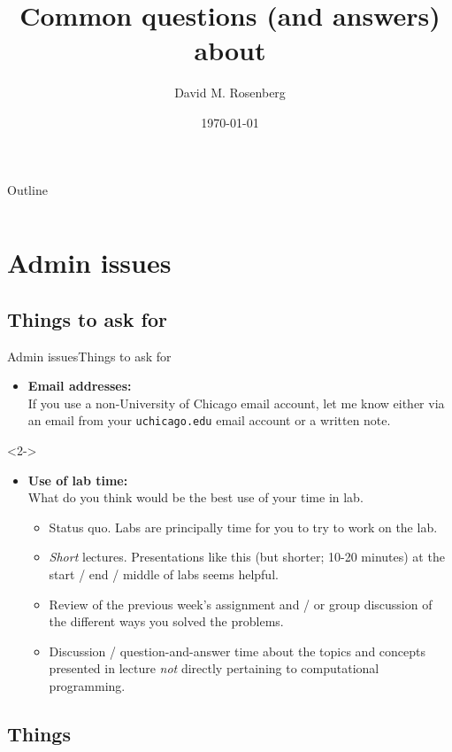 \documentclass[9pt]{beamer}
\title{Common questions (and answers) about \R  }
\author{David M. Rosenberg}
\institute[University of Chicago] %
{
  Committee on Neurobiology\\
  University of Chicago
}
\date{\today}
\begin{document}
\begin{frame}
  \titlepage
\end{frame}

\begin{frame}{Outline}
  \begin{columns}[c]
      \tableofcontents
    \end{columns}
\end{frame}




\section{Admin issues}
\subsection{Things to ask for}

\begin{frame}{Admin issues}{Things to ask for}
\begin{itemize}[<+->]
  \item \textbf{Email addresses:}\\
    If you use a non-University of Chicago email account, let me know either via an email from your {\tt uchicago.edu} email account or a written note.
  \end{itemize}
  \begin{onlyenv}<2->\begin{itemize}[<+->]
    \item \textbf{Use of lab time:}\\
      What do you think would be the best use of your time in lab.
      \begin{itemize}[<+->]
        \item Status quo.  Labs are principally time for you to try to work on the lab.
        \item \emph{Short} lectures. Presentations like this (but shorter; 10-20 minutes) at the start / end / middle of labs seems helpful.
        \item Review of the previous week's assignment and / or group discussion of the different ways you solved the problems.
        \item Discussion / question-and-answer time about the topics and concepts presented in lecture \emph{not} directly pertaining to computational programming.
      \end{itemize}
\end{itemize}
\end{onlyenv}
\end{frame}
  

\subsection{Things}
\end{document}
